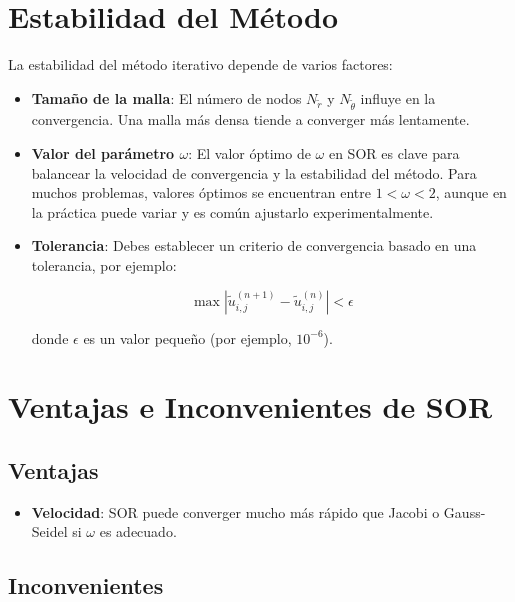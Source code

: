 \section{Estabilidad del Método}

La estabilidad del método iterativo depende de varios factores:

\begin{itemize}
    \item \textbf{Tamaño de la malla}: El número de nodos \( N_{\tilde{r}} \) y \( N_{\tilde{\theta}} \) influye en la convergencia. Una malla más densa tiende a converger más lentamente.
    \item \textbf{Valor del parámetro \( \omega \)}: El valor óptimo de \( \omega \) en SOR es clave para balancear la velocidad de convergencia y la estabilidad del método. Para muchos problemas, valores óptimos se encuentran entre \( 1 < \omega < 2 \), aunque en la práctica puede variar y es común ajustarlo experimentalmente.
    \item \textbf{Tolerancia}: Debes establecer un criterio de convergencia basado en una tolerancia, por ejemplo:

    \begin{equation}
        \max \left| \tilde{u}_{i,j}^{(n+1)} - \tilde{u}_{i,j}^{(n)} \right| < \epsilon
    \end{equation}

    donde \( \epsilon \) es un valor pequeño (por ejemplo, \( 10^{-6} \)).
\end{itemize}

\section{Ventajas e Inconvenientes de SOR}

\subsection{Ventajas}

\begin{itemize}
    \item \textbf{Velocidad}: SOR puede converger mucho más rápido que Jacobi o Gauss-Seidel si \( \omega \) es adecuado.
\end{itemize}

\subsection{Inconvenientes}

